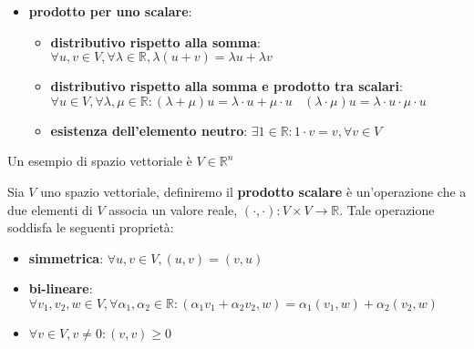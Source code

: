 \begin{itemize}
\begin{itemize}
    \end{itemize}
    \item \textbf{prodotto per uno scalare}:
    \begin{itemize}
        \item \textbf{distributivo rispetto alla somma}: $\forall u,v \in V, \forall \lambda \in \mathbb{R}, \lambda(u+v) = \lambda u+\lambda v$
        \item \textbf{distributivo rispetto alla somma e prodotto tra scalari}: $\forall u \in V, \forall \lambda,\mu\in \mathbb{R}: (\lambda + \mu)u = \lambda \cdot u + \mu \cdot u \ \ \ \ (\lambda \cdot \mu)u = \lambda \cdot u \cdot \mu \cdot u$
        \item \textbf{esistenza dell'elemento neutro}: $\exists 1 \in \mathbb{R}:1\cdot v = v, \forall v\in V$
    \end{itemize}
\end{itemize}
\begin{esempio}
    Un esempio di spazio vettoriale è $V\in \mathbb{R}^n$
\end{esempio}

\begin{definizione} 
    Sia $V$ uno spazio vettoriale, definiremo il \textbf{prodotto scalare} è un'operazione
    che a due elementi di $V$ associa un valore reale, $(\cdot, \cdot):V\times V \rightarrow \mathbb{R}$.
    Tale operazione soddisfa le seguenti proprietà:
    \begin{itemize}
        \item \textbf{simmetrica}: $\forall u,v \in V, (u,v) = (v,u)$
        \item \textbf{bi-lineare}: $\forall v_1,v_2,w \in V,\forall\alpha_1,\alpha_2 \in \mathbb{R}:(\alpha_1v_1+\alpha_2v_2, w) = \alpha_1(v_1, w) + \alpha_2(v_2, w)$
        \item $\forall v \in V, v\ne 0: (v,v) \ge 0$
    \end{itemize}
\end{definizione}

